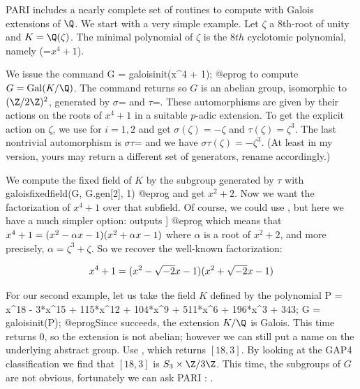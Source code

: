 
PARI includes a nearly complete set of routines to compute with Galois
extensions of $\Q$. We start with a very simple example.
Let $\zeta$ a $8$th-root of unity and $K=\Q(\zeta)$. The minimal
polynomial of $\zeta$ is the 8$th$ cyclotomic polynomial, namely
 (=$x^4+1$).

We issue the command
\bprog
G = galoisinit(x^4 + 1);
@eprog\noindent
to compute $G=\text{Gal}(K/\Q)$.  The command 
returns \kbd{[2,0;0,2]} so $G$ is an abelian group, isomorphic to $(\Z/2\Z)^2$, generated by
$\sigma$= and $\tau$=. These automorphisms are
given by their actions on the roots of $x^4+1$ in a suitable $p$-adic
extension. To get the explicit action on $\zeta$, we use
 for $i=1,2$ and get $\sigma(\zeta)=-\zeta$
and $\tau(\zeta)=\zeta^3$. The last nontrivial automorphism is
$\sigma\tau$= and we have
$\sigma\tau(\zeta)=-\zeta^3$. (At least in my version, yours may return a
different set of generators, rename accordingly.)

We compute the fixed field of $K$ by the subgroup generated by $\tau$ with
\bprog
galoisfixedfield(G, G.gen[2], 1)
@eprog\noindent
and get $x^2 + 2$. Now we want the factorization of $x^4+1$ over that
subfield. Of course, we could use , but here we have a much
simpler option:  outputs
\bprog
[x^2 + 2, Mod(x^3 + x, x^4 + 1), [x^2 - y*x - 1, x^2 + y*x - 1]]
@eprog\noindent
which means that
$x^4+1=(x^2-\alpha\*x-1)(x^2+\alpha\*x-1)$ where $\alpha$ is a root of $x^2+2$,
and more precisely, $\alpha=\zeta^3+\zeta$. So we recover the well-known
factorization:

$$x^4+1=(x^2-\sqrt{-2}\*x-1)(x^2+\sqrt{-2}\*x-1)$$

For our second example, let us take the field $K$ defined by the polynomial
\bprog
  P = x^18 - 3*x^15 + 115*x^12 + 104*x^9 + 511*x^6 + 196*x^3 + 343;
  G = galoisinit(P);
@eprog\noindent Since  succeeds,
the extension $K/\Q$ is Galois. This time  returns
$0$, so the extension is not abelian; however we can still put a name on the
underlying abstract group. Use , which returns $[18,
3]$. By looking at the GAP4 classification we find that $[18, 3]$ is
$S_3\times\Z/3\Z$. This time, the subgroups of $G$ are not obvious,
fortunately we can ask PARI : .

